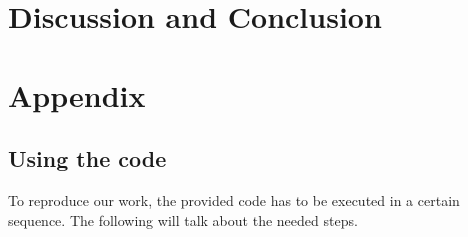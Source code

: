 \documentclass[10pt,a4paper]{article}
\begin{document}
	\section{Discussion and Conclusion}
	
	\section{Appendix}
		
		\subsection{Using the code}
		To reproduce our work, the provided code has to be executed in a certain sequence. The following will talk about the needed steps.

	\newpage

	
	
\end{document}
